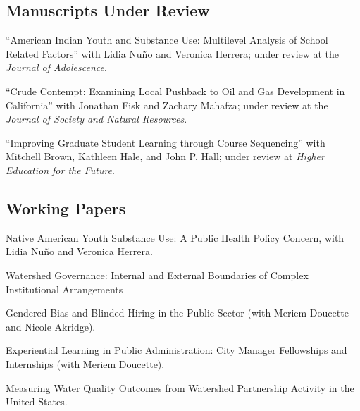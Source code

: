 \documentclass[11pt,letterpaper]{article}
\renewenvironment{itemize}{
  \begin{list}{}{
    \setlength{\leftmargin}{1.5em}
    \setlength{\itemsep}{0.25em}
    \setlength{\parskip}{0pt}
    \setlength{\parsep}{0.25em}
  }
}{
  \end{list}
}
\begin{document}
\subsection*{Manuscripts Under Review}

\begin{itemize}\leftmargin=2pt\itemindent=-15pt
	\item ``American Indian Youth and Substance Use: Multilevel Analysis of School Related Factors'' with Lidia Nu\~no and Veronica Herrera; under review at the \emph{Journal of Adolescence}.
	\item ``Crude Contempt: Examining Local Pushback to Oil and Gas Development in California'' with Jonathan Fisk and Zachary Mahafza; under review at the \emph{Journal of Society and Natural Resources}.
	\item ``Improving Graduate Student Learning through Course Sequencing'' with Mitchell Brown, Kathleen Hale, and John P. Hall; under review at \emph{Higher Education for the Future}. 
\end{itemize}

\subsection*{Working Papers}

\begin{itemize}\leftmargin=2pt\itemindent=-15pt

\item Native American Youth Substance Use: A Public Health Policy Concern, with Lidia Nu\~no and Veronica Herrera.
\item Watershed Governance: Internal and External Boundaries of Complex Institutional Arrangements
\item Gendered Bias and Blinded Hiring in the Public Sector (with Meriem Doucette and Nicole Akridge).
\item Experiential Learning in Public Administration: City Manager Fellowships and Internships (with Meriem Doucette).
\item Measuring Water Quality Outcomes from Watershed Partnership Activity in the United States.
\end{itemize}
\end{document}
